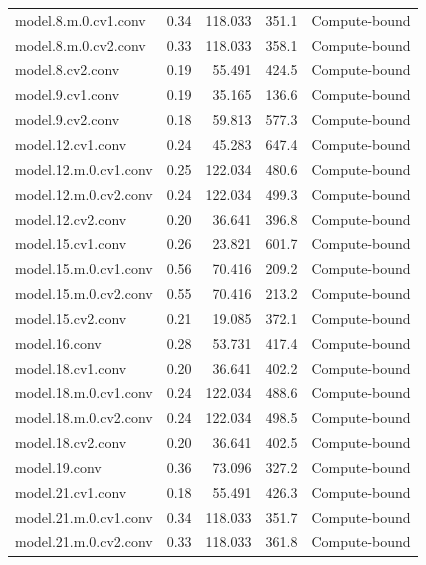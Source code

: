 \documentclass[12pt,a4paper]{report}
\begin{document}
\begin{longtable}{p{} r r r p{}}
model.8.m.0.cv1.conv                 & 0.34 & 118.033 & 351.1 & Compute-bound \\
model.8.m.0.cv2.conv                 & 0.33 & 118.033 & 358.1 & Compute-bound \\
model.8.cv2.conv                     & 0.19 & 55.491  & 424.5 & Compute-bound \\
model.9.cv1.conv                     & 0.19 & 35.165  & 136.6 & Compute-bound \\
model.9.cv2.conv                     & 0.18 & 59.813  & 577.3 & Compute-bound \\
model.12.cv1.conv                    & 0.24 & 45.283  & 647.4 & Compute-bound \\
model.12.m.0.cv1.conv                & 0.25 & 122.034 & 480.6 & Compute-bound \\
model.12.m.0.cv2.conv                & 0.24 & 122.034 & 499.3 & Compute-bound \\
model.12.cv2.conv                    & 0.20 & 36.641  & 396.8 & Compute-bound \\
model.15.cv1.conv                    & 0.26 & 23.821  & 601.7 & Compute-bound \\
model.15.m.0.cv1.conv                & 0.56 & 70.416  & 209.2 & Compute-bound \\
model.15.m.0.cv2.conv                & 0.55 & 70.416  & 213.2 & Compute-bound \\
model.15.cv2.conv                    & 0.21 & 19.085  & 372.1 & Compute-bound \\
model.16.conv                        & 0.28 & 53.731  & 417.4 & Compute-bound \\
model.18.cv1.conv                    & 0.20 & 36.641  & 402.2 & Compute-bound \\
model.18.m.0.cv1.conv                & 0.24 & 122.034 & 488.6 & Compute-bound \\
model.18.m.0.cv2.conv                & 0.24 & 122.034 & 498.5 & Compute-bound \\
model.18.cv2.conv                    & 0.20 & 36.641  & 402.5 & Compute-bound \\
model.19.conv                        & 0.36 & 73.096  & 327.2 & Compute-bound \\
model.21.cv1.conv                    & 0.18 & 55.491  & 426.3 & Compute-bound \\
model.21.m.0.cv1.conv                & 0.34 & 118.033 & 351.7 & Compute-bound \\
model.21.m.0.cv2.conv                & 0.33 & 118.033 & 361.8 & Compute-bound \\

\end{longtable}
\end{document}
